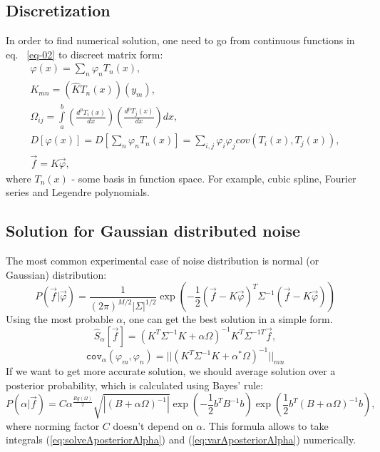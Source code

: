 \documentclass{webofc}
\begin{document}
\subsection{Discretization}

In order to find numerical solution, one need to go from continuous functions in eq. ~\ref{eq-02} to discreet matrix form:
\begin{equation}\label{eq:algebr}
	\begin{gathered}
      \varphi(x) = \sum \limits_n \varphi_n T_n(x),\\
      K_{mn} = (\hat{K}T_n(x))(y_m),\\
      \Omega_{ij} = \int\limits_a^b \left(\frac{d^pT_i(x)}{dx}\right)\left(\frac{d^pT_j(x)}{dx}\right)dx,\\
      D[\varphi(x)] = D[\sum \limits_n \varphi_n T_n(x)] = \sum\limits_{i,j} \varphi_i\varphi_j cov(T_i(x), T_j(x)),\\
      \vec{f} = K\vec{\varphi},
    \end{gathered}
\end{equation}
where $T_n(x)$ - some basis in function space. For example, cubic spline, Fourier series and Legendre polynomials.

\subsection{Solution for Gaussian distributed noise}

The most common experimental case of noise distribution is normal (or Gaussian) distribution:
\begin{equation}	\label{eq:gaussP}
	P\left(\vec{f}|\vec{\varphi}\right) = \frac{1}{(2\pi)^{M/2}|\Sigma|^{1/2}} 
    \exp\left(-\frac{1}{2}(\vec{f} - K\vec{\varphi})^T\Sigma^{-1}(\vec{f} - K\vec{\varphi})\right)
\end{equation}
Using  the most probable $\alpha$, one can get the best solution in a simple form.
\begin{equation} \label{eq:analit_solv}
	\hat{S}_{\alpha}[\vec{f}] = (K^T\Sigma^{-1}K+\alpha\Omega)^{-1}K^T\Sigma^{-1T}\vec{f},
\end{equation}
\begin{equation} \label{eq:analit_var}
	\texttt{cov}_{\alpha}(\varphi_m, \varphi_n) = ||(K^T\Sigma^{-1}K+\alpha^*\Omega)^{-1}||_{mn}
\end{equation}
If we want to get more accurate solution, we should average solution over a posterior probability, which is calculated using Bayes' rule: 
\begin{equation}
	\label{eq:alphaaposter}
	P(\alpha|\vec{f}) = C \alpha^{\frac{Rg(\Omega)}{2}}\sqrt{|(B+\alpha\Omega)^{-1}|}\exp(-\frac{1}{2}b^{T}B^{-1}b)\exp(\frac{1}{2}b^{T}(B+\alpha\Omega)^{-1}b),
\end{equation}
where norming factor $C$  doesn't depend on $\alpha$. This formula allows to take integrals (\ref{eq:solveAposteriorAlpha}) and (\ref{eq:varAposteriorAlpha}) numerically.
\end{document}
